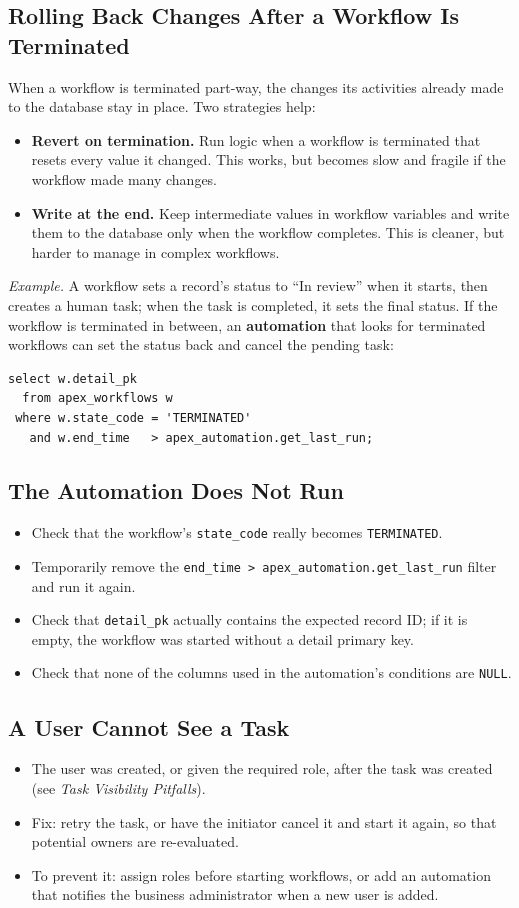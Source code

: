 \documentclass[11pt,a4paper]{article}
\begin{document}
\subsection{Rolling Back Changes After a Workflow Is Terminated}
When a workflow is terminated part-way, the changes its activities already made to the database stay in place. Two strategies help:
\begin{itemize}
\item \textbf{Revert on termination.} Run logic when a workflow is terminated that resets every value it changed. This works, but becomes slow and fragile if the workflow made many changes.
\item \textbf{Write at the end.} Keep intermediate values in workflow variables and write them to the database only when the workflow completes. This is cleaner, but harder to manage in complex workflows.
\end{itemize}
\textit{Example.} A workflow sets a record's status to ``In review'' when it starts, then creates a human task; when the task is completed, it sets the final status. If the workflow is terminated in between, an \textbf{automation} that looks for terminated workflows can set the status back and cancel the pending task:
\begin{lstlisting}
select w.detail_pk
  from apex_workflows w
 where w.state_code = 'TERMINATED'
   and w.end_time   > apex_automation.get_last_run;
\end{lstlisting}

\subsection{The Automation Does Not Run}
\begin{itemize}
\item Check that the workflow's \texttt{state\_code} really becomes \texttt{TERMINATED}.
\item Temporarily remove the \texttt{end\_time > apex\_automation.get\_last\_run} filter and run it again.
\item Check that \texttt{detail\_pk} actually contains the expected record ID; if it is empty, the workflow was started without a detail primary key.
\item Check that none of the columns used in the automation's conditions are \texttt{NULL}.
\end{itemize}

\subsection{A User Cannot See a Task}
\begin{itemize}
\item The user was created, or given the required role, after the task was created (see \emph{Task Visibility Pitfalls}).
\item Fix: retry the task, or have the initiator cancel it and start it again, so that potential owners are re-evaluated.
\item To prevent it: assign roles before starting workflows, or add an automation that notifies the business administrator when a new user is added.
\end{itemize}
\end{document}
